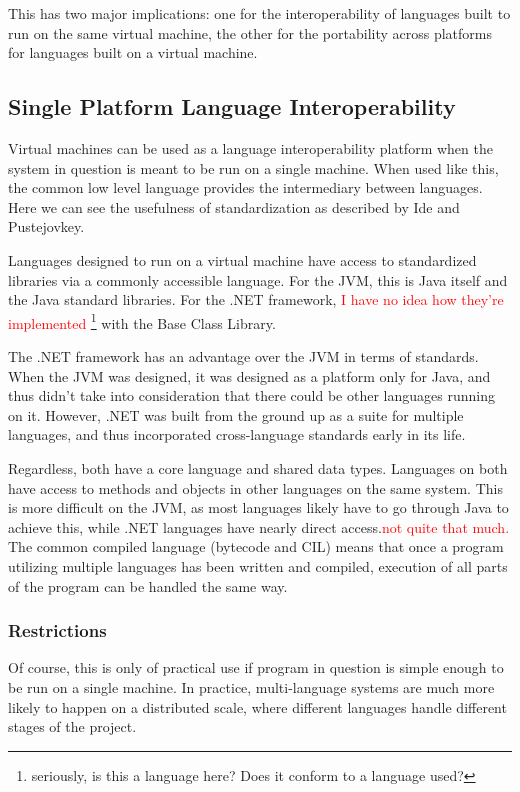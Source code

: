 \documentclass{sig-alternate}
\newcommand{\mycomment}[1]{\textcolor{red}{#1}}
\begin{document}
This has two major implications: one for the interoperability of languages built to run on the same virtual machine, the other for the portability across platforms for languages built on a virtual machine.

\subsection*{Single Platform Language Interoperability}
Virtual machines can be used as a language interoperability platform when the system in question is meant to be run on a single machine. When used like this, the common low level language provides the intermediary between languages. Here we can see the usefulness of standardization as described by Ide and Pustejovkey\cite{Ide:2010}.

Languages designed to run on a virtual machine have access to standardized libraries via a commonly accessible language. For the JVM, this is Java itself and the Java standard libraries. For the .NET framework, \mycomment{I have no idea how they're implemented \footnote{seriously, is this a language here? Does it conform to a language used?}} with the Base Class Library. 

The .NET framework has an advantage over the JVM in terms of standards. When the JVM was designed, it was designed as a platform only for Java, and thus didn't take into consideration that there could be other languages running on it. However, .NET was built from the ground up as a suite for multiple languages, and thus incorporated cross-language standards early in its life.

Regardless, both have a core language and shared data types. Languages on both have access to methods and objects in other languages on the same system. This is more difficult on the JVM, as most languages likely have to go through Java to achieve this, while .NET languages have nearly direct access.\mycomment{not quite that much.} The common compiled language (bytecode and CIL) means that once a program utilizing multiple languages has been written and compiled, execution of all parts of the program can be handled the same way.

\subsubsection*{Restrictions}
Of course, this is only of practical use if program in question is simple enough to be run on a single machine. In practice, multi-language systems are much more likely to happen on a distributed scale, where different languages handle different stages of the project.
\end{document}
